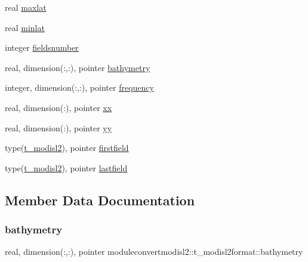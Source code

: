 \begin{DoxyCompactItemize}
\item 
real \mbox{\hyperlink{structmoduleconvertmodisl2_1_1t__modisl2format_a590848151e022e91cedba07f9d178037}{maxlat}}
\item 
real \mbox{\hyperlink{structmoduleconvertmodisl2_1_1t__modisl2format_a85227c7ef4c7a2f172d9fac305c14d4d}{minlat}}
\item 
integer \mbox{\hyperlink{structmoduleconvertmodisl2_1_1t__modisl2format_a2999f59aaea8f8ae6a7241dc3cdcafb1}{fieldsnumber}}
\item 
real, dimension(\+:,\+:), pointer \mbox{\hyperlink{structmoduleconvertmodisl2_1_1t__modisl2format_acce2d8ff7f71fe52b7a3acd10838c172}{bathymetry}}
\item 
integer, dimension(\+:,\+:), pointer \mbox{\hyperlink{structmoduleconvertmodisl2_1_1t__modisl2format_a80be73738f78b5ca32aab3d7ba68c950}{frequency}}
\item 
real, dimension(\+:), pointer \mbox{\hyperlink{structmoduleconvertmodisl2_1_1t__modisl2format_a342202d7b4d06b4f3a586c2f9b2c0e16}{xx}}
\item 
real, dimension(\+:), pointer \mbox{\hyperlink{structmoduleconvertmodisl2_1_1t__modisl2format_a90aa43674aa38a9b463a6befad57143c}{yy}}
\item 
type(\mbox{\hyperlink{structmoduleconvertmodisl2_1_1t__modisl2}{t\+\_\+modisl2}}), pointer \mbox{\hyperlink{structmoduleconvertmodisl2_1_1t__modisl2format_acf05183da2a23c59dc0614a097fcc252}{firstfield}}
\item 
type(\mbox{\hyperlink{structmoduleconvertmodisl2_1_1t__modisl2}{t\+\_\+modisl2}}), pointer \mbox{\hyperlink{structmoduleconvertmodisl2_1_1t__modisl2format_abe3051d2be5363f7e6077fc6d670c085}{lastfield}}
\end{DoxyCompactItemize}


\subsection{Member Data Documentation}
\mbox{\label{structmoduleconvertmodisl2_1_1t__modisl2format_acce2d8ff7f71fe52b7a3acd10838c172}} 
\subsubsection{\texorpdfstring{bathymetry}{bathymetry}}
{\footnotesize\ttfamily real, dimension(\+:,\+:), pointer moduleconvertmodisl2\+::t\+\_\+modisl2format\+::bathymetry\hspace{0.3cm}{\ttfamily [private]}}

